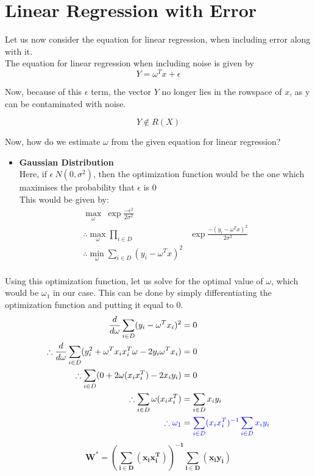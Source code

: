 \documentclass[11pt, twosides]{article}
\begin{document}
\section{Linear Regression with Error}
Let us now consider the equation for linear regression, when including error along with it.\\

The equation for linear regression when including noise is given by
\begin{equation*}
    Y = \omega^Tx + \epsilon
\end{equation*}

Now, because of this $\epsilon$ term, the vector $Y$ no longer lies in the rowspace of $x$, as y can be contaminated with noise.

\begin{equation*}
    Y \notin R(X)
\end{equation*}

Now, how do we estimate $\omega$ from the given equation for linear regression?\\

\begin{itemize}
    \item {\bf Gaussian Distribution}\\
    Here, if $\epsilon ~ N(0,\sigma^2)$, then the optimization function would be the one which maximises the probability that $\epsilon$ is 0\\
    This would be given by:\\
    \begin{align*}
        \max_{\omega}\ \exp{\frac{-\epsilon^2}{2\sigma^2}}\\
        \therefore \max_{\omega} \prod_{i \in D} & \exp{\frac{-(y_i - \omega^T x)^2}{2\sigma^2}}\\
        \therefore \min_{\omega} \sum_{i \in D} (y_i - \omega^T x)^2\\
    \end{align*}
\end{itemize}
    Using this optimization function, let us solve for the optimal value of $\omega$, which would be $\omega_1$ in our case. This can be done by simply differentiating the optimization function and putting it equal to 0.\\
    
    \begin{align*}
        \frac{d}{d\omega} \sum_{i \in D} (y_i - \omega^T x_i)^2 &= 0\\
        \therefore \frac{d}{d\omega} \sum_{i \in D}(y_i^2 + \omega^Tx_ix_i^T\omega - 2y_i\omega^Tx_i) &= 0\\
        \therefore \sum_{i \in D}(0 + 2\omega(x_ix_i^T) - 2x_iy_i) &= 0\\
        \therefore \sum_{i \in D}\omega(x_ix_i^T) &= \sum_{i \in D} x_iy_i\\
        \color{blue}
        \therefore \omega_1 &= \color{blue} \sum_{i \in D} (x_ix_i^T)^{-1} \sum_{i \in D} x_iy_i
    \end{align*}
    \color{black}
\begin{equation}
    \mathbf{ W^* = (\sum_{i \in D} (x_i x_i^T))^{-1} \sum_{i \in D} (x_i y_i)} 
\end{equation}
\end{document}
